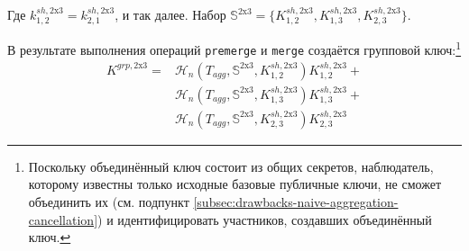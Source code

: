 Где $k^{sh,\textrm{2x3}}_{1,2} = k^{sh,\textrm{2x3}}_{2,1}$, и так далее. Набор $\mathbb{S}^{\textrm{2x3}} = \{ K^{sh,\textrm{2x3}}_{1,2}, K^{sh,\textrm{2x3}}_{1,3}, K^{sh,\textrm{2x3}}_{2,3}\}$.

В результате выполнения операций {\tt premerge} и {\tt merge} создаётся групповой ключ:\footnote{Поскольку объединённый ключ состоит из общих секретов, наблюдатель, которому известны только исходные базовые публичные ключи, не сможет объединить их (см. подпункт \ref{subsec:drawbacks-naive-aggregation-cancellation}) и идентифицировать участников, создавших объединённый ключ.}\vspace{.175cm}
\begin{align*}
    K^{grp,\textrm{2x3}} = &\mathcal{H}_n(T_{agg},\mathbb{S}^{\textrm{2x3}},K^{sh,\textrm{2x3}}_{1,2}) K^{sh,\textrm{2x3}}_{1,2} + \\
                           &\mathcal{H}_n(T_{agg},\mathbb{S}^{\textrm{2x3}},K^{sh,\textrm{2x3}}_{1,3}) K^{sh,\textrm{2x3}}_{1,3} + \\
                           &\mathcal{H}_n(T_{agg},\mathbb{S}^{\textrm{2x3}},K^{sh,\textrm{2x3}}_{2,3}) K^{sh,\textrm{2x3}}_{2,3}
\end{align*}

